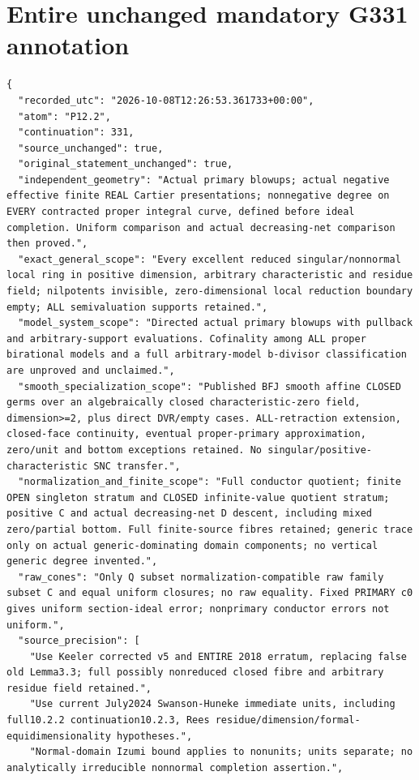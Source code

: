 \documentclass[11pt]{article}
\begin{document}
\appendix
\section{Entire unchanged mandatory G331 annotation}
\begin{Verbatim}[breaklines=true,fontsize=\footnotesize]
{
  "recorded_utc": "2026-10-08T12:26:53.361733+00:00",
  "atom": "P12.2",
  "continuation": 331,
  "source_unchanged": true,
  "original_statement_unchanged": true,
  "independent_geometry": "Actual primary blowups; actual negative effective finite REAL Cartier presentations; nonnegative degree on EVERY contracted proper integral curve, defined before ideal completion. Uniform comparison and actual decreasing-net comparison then proved.",
  "exact_general_scope": "Every excellent reduced singular/nonnormal local ring in positive dimension, arbitrary characteristic and residue field; nilpotents invisible, zero-dimensional local reduction boundary empty; ALL semivaluation supports retained.",
  "model_system_scope": "Directed actual primary blowups with pullback and arbitrary-support evaluations. Cofinality among ALL proper birational models and a full arbitrary-model b-divisor classification are unproved and unclaimed.",
  "smooth_specialization_scope": "Published BFJ smooth affine CLOSED germs over an algebraically closed characteristic-zero field, dimension>=2, plus direct DVR/empty cases. ALL-retraction extension, closed-face continuity, eventual proper-primary approximation, zero/unit and bottom exceptions retained. No singular/positive-characteristic SNC transfer.",
  "normalization_and_finite_scope": "Full conductor quotient; finite OPEN singleton stratum and CLOSED infinite-value quotient stratum; positive C and actual decreasing-net D descent, including mixed zero/partial bottom. Full finite-source fibres retained; generic trace only on actual generic-dominating domain components; no vertical generic degree invented.",
  "raw_cones": "Only Q subset normalization-compatible raw family subset C and equal uniform closures; no raw equality. Fixed PRIMARY c0 gives uniform section-ideal error; nonprimary conductor errors not uniform.",
  "source_precision": [
    "Use Keeler corrected v5 and ENTIRE 2018 erratum, replacing false old Lemma3.3; full possibly nonreduced closed fibre and arbitrary residue field retained.",
    "Use current July2024 Swanson-Huneke immediate units, including full10.2.2 continuation10.2.3, Rees residue/dimension/formal-equidimensionality hypotheses.",
    "Normal-domain Izumi bound applies to nonunits; units separate; no analytically irreducible nonnormal completion assertion.",

\end{Verbatim}
\end{document}
